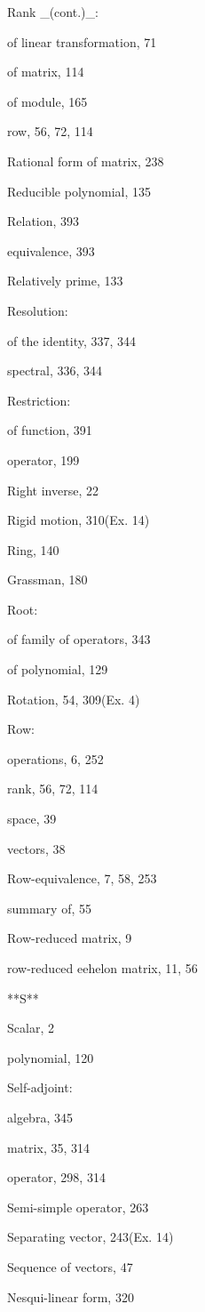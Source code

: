 Rank _(cont.)_:

of linear transformation, 71

of matrix, 114

of module, 165

row, 56, 72, 114

Rational form of matrix, 238

Reducible polynomial, 135

Relation, 393

equivalence, 393

Relatively prime, 133

Resolution:

of the identity, 337, 344

spectral, 336, 344

Restriction:

of function, 391

operator, 199

Right inverse, 22

Rigid motion, 310(Ex. 14)

Ring, 140

Grassman, 180

Root:

of family of operators, 343

of polynomial, 129

Rotation, 54, 309(Ex. 4)

Row:

operations, 6, 252

rank, 56, 72, 114

space, 39

vectors, 38

Row-equivalence, 7, 58, 253

summary of, 55

Row-reduced matrix, 9

row-reduced eehelon matrix, 11, 56

**S**

Scalar, 2

polynomial, 120

Self-adjoint:

algebra, 345

matrix, 35, 314

operator, 298, 314

Semi-simple operator, 263

Separating vector, 243(Ex. 14)

Sequence of vectors, 47

Nesqui-linear form, 320

